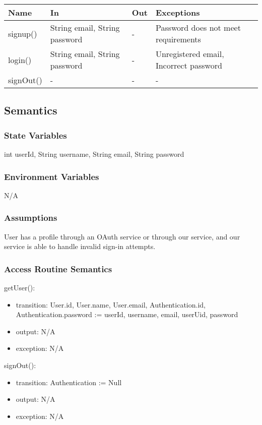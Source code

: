 \documentclass[12pt, titlepage]{article}
\begin{document}
\begin{center}
\begin{tabular}{p{3cm} p{4cm} p{4cm} p{3cm}}
\hline
\textbf{Name} & \textbf{In} & \textbf{Out} & \textbf{Exceptions} \\
\hline
signup() & String email, String password & - & Password does not meet requirements \\
login() & String email, String password & - & Unregistered email, Incorrect password \\
signOut() & - & - & - \\
\hline
\end{tabular}
\end{center}

\subsection{Semantics}

\subsubsection{State Variables}
int userId, String username, String email, String password

\subsubsection{Environment Variables}
N/A

\subsubsection{Assumptions}
User has a profile through an OAuth service or through our service, and our service is able to handle invalid sign-in attempts.

\subsubsection{Access Routine Semantics}

\noindent getUser():
\begin{itemize}
\item transition: User.id, User.name, User.email, Authentication.id, Authentication.password := userId, username, email, userUid, password
\item output: N/A
\item exception: N/A
\end{itemize}

\noindent signOut():
\begin{itemize}
\item transition: Authentication := Null
\item output: N/A
\item exception: N/A
\end{itemize}
\end{document}
